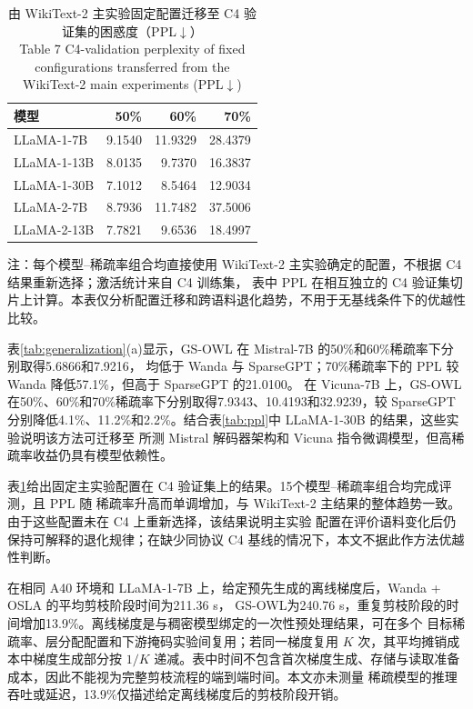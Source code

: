 \documentclass[UTF8,fontset=fandol]{ctexart}
\renewcommand{\arraystretch}{1.08}
\newcommand{\method}{GS-OWL}
\begin{document}
\begin{table}[!htbp]
\centering
\caption{由 WikiText-2 主实验固定配置迁移至 C4 验证集的困惑度（PPL$\downarrow$）\\
Table 7 C4-validation perplexity of fixed configurations transferred from the WikiText-2 main experiments (PPL$\downarrow$)}
\label{tab:c4_validation}
\scriptsize
\setlength{\tabcolsep}{7.0pt}
\renewcommand{\arraystretch}{0.98}
\begin{tabular}{lrrr}
\toprule
模型 & 50\% & 60\% & 70\% \\
\midrule
LLaMA-1-7B  & 9.1540 & 11.9329 & 28.4379 \\
LLaMA-1-13B & 8.0135 & 9.7370  & 16.3837 \\
LLaMA-1-30B & 7.1012 & 8.5464  & 12.9034 \\
LLaMA-2-7B  & 8.7936 & 11.7482 & 37.5006 \\
LLaMA-2-13B & 7.7821 & 9.6536  & 18.4997 \\
\bottomrule
\end{tabular}
\vspace{2pt}
\parbox{0.88\textwidth}{\scriptsize
注：每个模型--稀疏率组合均直接使用 WikiText-2 主实验确定的配置，不根据 C4 结果重新选择；激活统计来自 C4 训练集，
表中 PPL 在相互独立的 C4 验证集切片上计算。本表仅分析配置迁移和跨语料退化趋势，不用于无基线条件下的优越性比较。}
\end{table}

表\ref{tab:generalization}(a)显示，GS-OWL 在 Mistral-7B 的50\%和60\%稀疏率下分别取得5.6866和7.9216，
均低于 Wanda 与 SparseGPT；70\%稀疏率下的 PPL 较 Wanda 降低57.1\%，但高于 SparseGPT 的21.0100。
在 Vicuna-7B 上，GS-OWL 在50\%、60\%和70\%稀疏率下分别取得7.9343、10.4193和32.9239，较 SparseGPT
分别降低4.1\%、11.2\%和2.2\%。结合表\ref{tab:ppl}中 LLaMA-1-30B 的结果，这些实验说明该方法可迁移至
所测 Mistral 解码器架构和 Vicuna 指令微调模型，但高稀疏率收益仍具有模型依赖性。

表\ref{tab:c4_validation}给出固定主实验配置在 C4 验证集上的结果。15个模型--稀疏率组合均完成评测，且 PPL 随
稀疏率升高而单调增加，与 WikiText-2 主结果的整体趋势一致。由于这些配置未在 C4 上重新选择，该结果说明主实验
配置在评价语料变化后仍保持可解释的退化规律；在缺少同协议 C4 基线的情况下，本文不据此作方法优越性判断。

在相同 A40 环境和 LLaMA-1-7B 上，给定预先生成的离线梯度后，Wanda + OSLA 的平均剪枝阶段时间为211.36 s，
\method 为240.76 s，重复剪枝阶段的时间增加13.9\%。离线梯度是与稠密模型绑定的一次性预处理结果，可在多个
目标稀疏率、层分配配置和下游掩码实验间复用；若同一梯度复用 $K$ 次，其平均摊销成本中梯度生成部分按 $1/K$
递减。表中时间不包含首次梯度生成、存储与读取准备成本，因此不能视为完整剪枝流程的端到端时间。本文亦未测量
稀疏模型的推理吞吐或延迟，13.9\%仅描述给定离线梯度后的剪枝阶段开销。
\end{document}
